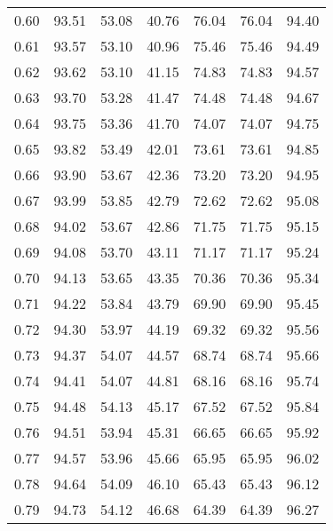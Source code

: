 \begin{tabular}{|c|c|c|c|c|c|c|}
      0.60 &     93.51 &     53.08 &      40.76 &   76.04 &      76.04 &         94.40 \\
      0.61 &     93.57 &     53.10 &      40.96 &   75.46 &      75.46 &         94.49 \\
      0.62 &     93.62 &     53.10 &      41.15 &   74.83 &      74.83 &         94.57 \\
      0.63 &     93.70 &     53.28 &      41.47 &   74.48 &      74.48 &         94.67 \\
      0.64 &     93.75 &     53.36 &      41.70 &   74.07 &      74.07 &         94.75 \\
      0.65 &     93.82 &     53.49 &      42.01 &   73.61 &      73.61 &         94.85 \\
      0.66 &     93.90 &     53.67 &      42.36 &   73.20 &      73.20 &         94.95 \\
      0.67 &     93.99 &     53.85 &      42.79 &   72.62 &      72.62 &         95.08 \\
      0.68 &     94.02 &     53.67 &      42.86 &   71.75 &      71.75 &         95.15 \\
      0.69 &     94.08 &     53.70 &      43.11 &   71.17 &      71.17 &         95.24 \\
      0.70 &     94.13 &     53.65 &      43.35 &   70.36 &      70.36 &         95.34 \\
      0.71 &     94.22 &     53.84 &      43.79 &   69.90 &      69.90 &         95.45 \\
      0.72 &     94.30 &     53.97 &      44.19 &   69.32 &      69.32 &         95.56 \\
      0.73 &     94.37 &     54.07 &      44.57 &   68.74 &      68.74 &         95.66 \\
      0.74 &     94.41 &     54.07 &      44.81 &   68.16 &      68.16 &         95.74 \\
      0.75 &     94.48 &     54.13 &      45.17 &   67.52 &      67.52 &         95.84 \\
      0.76 &     94.51 &     53.94 &      45.31 &   66.65 &      66.65 &         95.92 \\
      0.77 &     94.57 &     53.96 &      45.66 &   65.95 &      65.95 &         96.02 \\
      0.78 &     94.64 &     54.09 &      46.10 &   65.43 &      65.43 &         96.12 \\
      0.79 &     94.73 &     54.12 &      46.68 &   64.39 &      64.39 &         96.27 \\

\end{tabular}
